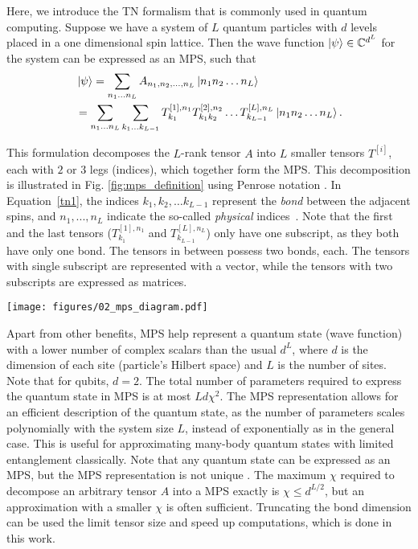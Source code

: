 Here, we introduce the TN formalism that is commonly used in quantum computing. Suppose we have a system of $L$ quantum particles with $d$ levels placed in a one dimensional spin lattice. Then the wave function $\ket\psi \in \mathbb{C}^{d^L}$ for the system can be expressed as an MPS, such that
\begin{align}
    & \ket{\psi} = \sum_{n_1 \dots n_L}A_{n_1, n_2, \dots, n_L} \ket{n_1 n_2 \dots n_L} \\
    & = \sum_{n_1 \dots n_L}\sum_{k_1 \dots k_{L-1}} T_{k_1}^{[1], n_1}T_{k_1 k_2}^{[2], n_2}\dots T_{k_{L-1}}^{[L], n_L} \ket{n_1 n_2 \dots n_L}.
\label{tn1}
\end{align}

This formulation decomposes the $L$-rank tensor $A$ into $L$ smaller tensors $T^{[i]}$, each with $2$ or $3$ legs (indices), which together form the MPS. This decomposition is illustrated in Fig. \ref{fig:mps_definition} using Penrose notation \cite{Penrose1971}. In Equation~\eqref{tn1}, the indices $k_1, k_2,\dots k_{L-1}$ represent the \emph{bond} between the adjacent spins, and $n_1, ..., n_L$ indicate the so-called \emph{physical} indices~\cite{SCHOLLWOCK201196}. Note that the first and the last tensors ($T_{k_1}^{[1],n_1}$ and $T_{k_{L-1}}^{[L],n_L}$) only have one subscript, as they both have only one bond. The tensors in between possess two bonds, each. The tensors with single subscript are represented with a vector, while the tensors with two subscripts are expressed as matrices.

\begin{figure*}[!htbp]
    \centering
    \texttt{[image: figures/02\_mps\_diagram.pdf]}
    \caption{Diagram of a Matrix Product State with $L=6$ elements.}
    \label{fig:mps_definition}
\end{figure*}

Apart from other benefits, MPS help represent a quantum state (wave function) with a lower number of complex scalars than the usual $d^L$, where $d$ is the dimension of each site (particle's Hilbert space) and $L$ is the number of sites. Note that for qubits, $d=2$. The total number of parameters required to express the quantum state in MPS is at most $L d \chi^2$. The MPS representation allows for an efficient description of the quantum state, as the number of parameters scales polynomially with the system size $L$, instead of exponentially as in the general case. This is useful for approximating many-body quantum states with limited entanglement classically. Note that any quantum state can be expressed as an MPS, but the MPS representation is not unique \cite{SCHOLLWOCK201196}. The maximum $\chi$ required to decompose an arbitrary tensor $A$ into a MPS exactly is $\chi\leq d^{L/2}$, but an approximation with a smaller $\chi$ is often sufficient.
Truncating the bond dimension can be used the limit tensor size and speed up computations, which is done in this work. 



